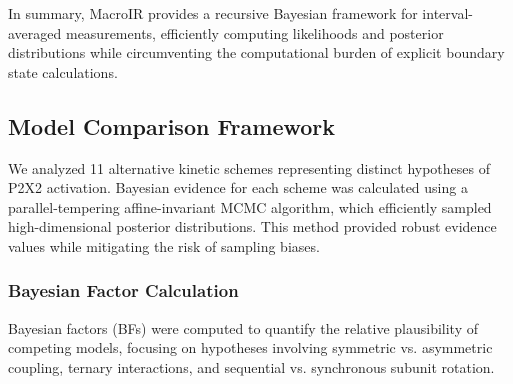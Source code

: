 \documentclass[pdflatex,sn-mathphys-num]{sn-jnl}%
\theoremstyle{thmstyleone}%
\theoremstyle{thmstyletwo}%
\theoremstyle{thmstylethree}%
\begin{document}
In summary, MacroIR provides a recursive Bayesian framework for interval-averaged measurements, efficiently computing likelihoods and posterior distributions while circumventing the computational burden of explicit boundary state calculations.
\subsection{Model Comparison Framework}
We analyzed 11 alternative kinetic schemes representing distinct hypotheses of P2X2 activation. Bayesian evidence for each scheme was calculated using a parallel-tempering affine-invariant MCMC algorithm, which efficiently sampled high-dimensional posterior distributions. This method provided robust evidence values while mitigating the risk of sampling biases.


\subsubsection{Bayesian Factor Calculation}
Bayesian factors (BFs) were computed to quantify the relative plausibility of competing models, focusing on hypotheses involving symmetric vs. asymmetric coupling, ternary interactions, and sequential vs. synchronous subunit rotation.

\newpage
\end{document}
